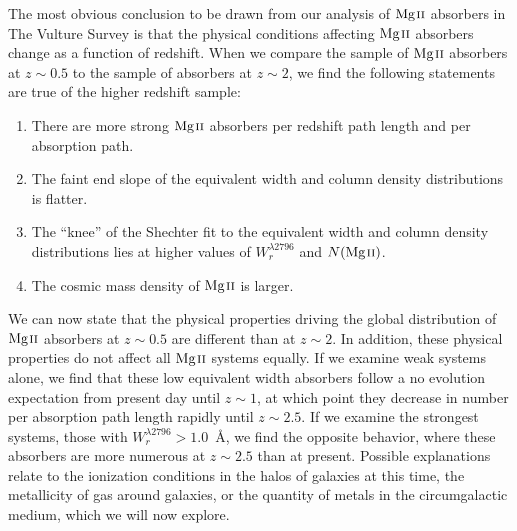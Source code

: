 \documentclass[iop,apj,numberedappendix,appendixfloats,twocolappendix]{emulateapj}
\begin{document}
The most obvious conclusion to be drawn from our analysis of ${\hbox{{\rm Mg}\kern 0.1em{\sc ii}}}$ absorbers in The Vulture Survey is that the physical conditions affecting ${\hbox{{\rm Mg}\kern 0.1em{\sc ii}}}$ absorbers change as a function of redshift. When we compare the sample of ${\hbox{{\rm Mg}\kern 0.1em{\sc ii}}}$ absorbers at $z \sim 0.5$ to the sample of absorbers at $z \sim 2$, we find the following statements are true of the higher redshift sample:

\begin{enumerate}
\item There are more strong ${\hbox{{\rm Mg}\kern 0.1em{\sc ii}}}$ absorbers per redshift path length and per absorption path.
\item The faint end slope of the equivalent width and column density distributions is flatter.
\item The ``knee'' of the Shechter fit to the equivalent width and column density distributions lies at higher values of $W_r^{\lambda2796}$ and $N(\hbox{{\rm Mg}\kern 0.1em{\sc ii}})$.
\item The cosmic mass density of ${\hbox{{\rm Mg}\kern 0.1em{\sc ii}}}$ is larger.
\end{enumerate}

\noindent We can now state that the physical properties driving the global distribution of ${\hbox{{\rm Mg}\kern 0.1em{\sc ii}}}$ absorbers at $z \sim 0.5$ are different than at $z \sim 2$. In addition, these physical properties do not affect all ${\hbox{{\rm Mg}\kern 0.1em{\sc ii}}}$ systems equally. If we examine weak systems alone, we find that these low equivalent width absorbers follow a no evolution expectation from present day until $z \sim 1$, at which point they decrease in number per absorption path length rapidly until $z \sim 2.5$. If we examine the strongest systems, those with $W_r^{\lambda2796} > 1.0$~{\AA}, we find the opposite behavior, where these absorbers are more numerous at $z \sim 2.5$ than at present. Possible explanations relate to the ionization conditions in the halos of galaxies at this time, the metallicity of gas around galaxies, or the quantity of metals in the circumgalactic medium, which we will now explore. 
\end{document}
